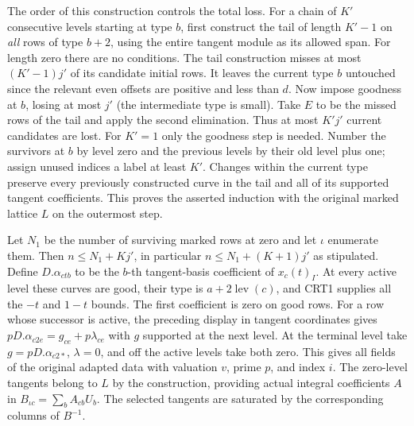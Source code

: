 The order of this construction controls the total loss. For a chain
of $K'$ consecutive levels starting at type $b$, first construct the
tail of length $K'-1$ on \emph{all} rows of type $b+2$, using the
entire tangent module as its allowed span. For length zero there are
no conditions. The tail construction misses at most $(K'-1)j'$
of its candidate initial rows. It leaves the current type $b$
untouched since the relevant even offsets are positive and less
than $d$. Now impose goodness at $b$, losing at most $j'$ (the
intermediate type is small). Take $E$ to be the missed rows of
the tail and apply the second elimination. Thus at most $K'j'$
current candidates are lost. For $K'=1$ only the goodness step
is needed. Number the survivors at $b$ by level zero and the
previous levels by their old level plus one; assign unused indices
a label at least $K'$. Changes within the current type preserve every
previously constructed curve in the tail and all of its supported
tangent coefficients. This proves the asserted induction with the
original marked lattice $L$ on the outermost step.

Let $N_1$ be the number of surviving marked rows at zero and let
$\iota$ enumerate them. Then $n\le N_1+Kj'$, in particular
$n\le N_1+(K+1)j'$ as stipulated. Define $D.\alpha_{ctb}$ to be
the $b$-th tangent-basis coefficient of $x_c(t)_I$. At every active
level these curves are good, their type is $a+2\operatorname{lev}(c)$,
and CRT1 supplies all the $-t$ and $1-t$ bounds. The first
coefficient is zero on good rows. For a row whose successor is
active, the preceding display in tangent coordinates gives
$pD.\alpha_{c2e}=g_{ce}+p\lambda_{ce}$ with $g$ supported at the
next level. At the terminal level take $g=pD.\alpha_{c2*}$,
$\lambda=0$, and off the active levels take both zero. This gives
all fields of the original adapted data with valuation $v$, prime
$p$, and index $i$. The zero-level tangents belong to $L$ by the
construction, providing actual integral coefficients $A$ in
$B_{\iota c}=\sum_b A_{cb} U_b$. The selected tangents are
saturated by the corresponding columns of $B^{-1}$.

